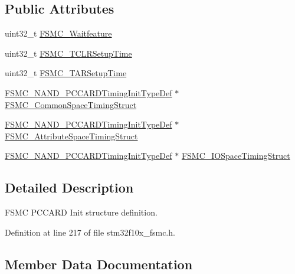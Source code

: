 \subsection*{Public Attributes}
\begin{DoxyCompactItemize}
\item 
uint32\+\_\+t \hyperlink{struct_f_s_m_c___p_c_c_a_r_d_init_type_def_a3ffd8c627ffe3ac90dfbfe93a8b97c26}{F\+S\+M\+C\+\_\+\+Waitfeature}
\item 
uint32\+\_\+t \hyperlink{struct_f_s_m_c___p_c_c_a_r_d_init_type_def_a15db9675791f6f9c7fd82fe1084ff694}{F\+S\+M\+C\+\_\+\+T\+C\+L\+R\+Setup\+Time}
\item 
uint32\+\_\+t \hyperlink{struct_f_s_m_c___p_c_c_a_r_d_init_type_def_ac83f977e01623595e0aa8dd0b1eb3fcc}{F\+S\+M\+C\+\_\+\+T\+A\+R\+Setup\+Time}
\item 
\hyperlink{struct_f_s_m_c___n_a_n_d___p_c_c_a_r_d_timing_init_type_def}{F\+S\+M\+C\+\_\+\+N\+A\+N\+D\+\_\+\+P\+C\+C\+A\+R\+D\+Timing\+Init\+Type\+Def} $\ast$ \hyperlink{struct_f_s_m_c___p_c_c_a_r_d_init_type_def_a87cb99ebe9b5ed570c6467abc9c2ef6d}{F\+S\+M\+C\+\_\+\+Common\+Space\+Timing\+Struct}
\item 
\hyperlink{struct_f_s_m_c___n_a_n_d___p_c_c_a_r_d_timing_init_type_def}{F\+S\+M\+C\+\_\+\+N\+A\+N\+D\+\_\+\+P\+C\+C\+A\+R\+D\+Timing\+Init\+Type\+Def} $\ast$ \hyperlink{struct_f_s_m_c___p_c_c_a_r_d_init_type_def_aee510f2e6e6ef18e7f5eedfed702f697}{F\+S\+M\+C\+\_\+\+Attribute\+Space\+Timing\+Struct}
\item 
\hyperlink{struct_f_s_m_c___n_a_n_d___p_c_c_a_r_d_timing_init_type_def}{F\+S\+M\+C\+\_\+\+N\+A\+N\+D\+\_\+\+P\+C\+C\+A\+R\+D\+Timing\+Init\+Type\+Def} $\ast$ \hyperlink{struct_f_s_m_c___p_c_c_a_r_d_init_type_def_abd9b9e8d7623829a40e5255b0949a3a1}{F\+S\+M\+C\+\_\+\+I\+O\+Space\+Timing\+Struct}
\end{DoxyCompactItemize}


\subsection{Detailed Description}
F\+S\+MC P\+C\+C\+A\+RD Init structure definition. 

Definition at line 217 of file stm32f10x\+\_\+fsmc.\+h.



\subsection{Member Data Documentation}
\mbox{\label{struct_f_s_m_c___p_c_c_a_r_d_init_type_def_aee510f2e6e6ef18e7f5eedfed702f697}} 
